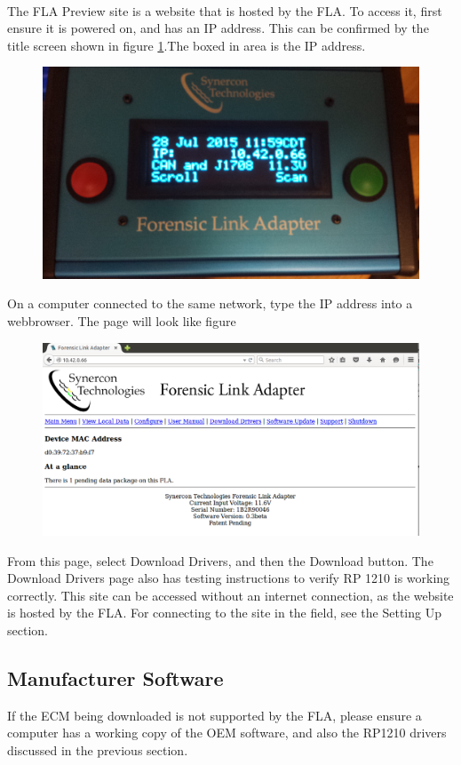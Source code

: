 \documentclass[11pt]{article}
\begin{document}
\paragraph{  }
The FLA Preview site is a website that is hosted by the FLA. To access it, first ensure it is powered on, and has an IP address. This can be confirmed by the title screen shown in figure \ref{fig:fla_title_screen}.The boxed in area is the IP address.
\begin{figure}[tbph]
\centering
\includegraphics[width=0.5\linewidth]{../media/fla_screens/title_screen}
\label{fig:fla_title_screen}
\caption{}
\end{figure}
On a computer connected to the same network, type the IP address into a webbrowser. The page will look like figure 
\begin{figure}[tbph]
\centering
\includegraphics[width=1\linewidth]{../media/fla_preview_screenshots/main_page}
\label{fig:preview_main_page}
\caption{}
\end{figure}
From this page, select Download Drivers, and then the Download button. The Download Drivers page also has testing instructions to verify RP 1210 is working correctly. This site can be accessed without an internet connection, as the website is hosted by the FLA. For connecting to the site in the field, see the Setting Up section.
\subsection{Manufacturer Software}
If the ECM being downloaded is not supported by the FLA, please ensure a computer has a working copy of the OEM software, and also the RP1210 drivers discussed in the previous section.
\end{document}
